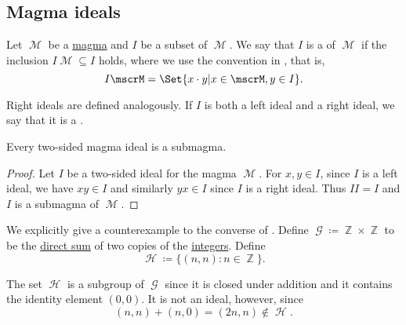 \subsection{Magma ideals}\label{sec:magma_ideals}

\begin{definition}\label{def:magma_ideal}
  Let \( \mscrM \) be a \hyperref[def:magma]{magma} and \( I \) be a subset of \( \mscrM \). We say that \( I \) is a  of \( \mscrM \) if the inclusion \( I\mscrM \subseteq I \) holds, where we use the convention in , that is,
  \begin{equation*}
    I \mscrM = \Set{ x \cdot y | x \in \mscrM, y \in I }.
  \end{equation*}

  Right ideals are defined analogously. If \( I \) is both a left ideal and a right ideal, we say that it is a .
\end{definition}

\begin{proposition}\label{thm:magma_ideal_is_submagma}
  Every two-sided magma ideal is a submagma.
\end{proposition}
\begin{proof}
  Let \( I \) be a two-sided ideal for the magma \( \mscrM \). For \( x, y \in I \), since \( I \) is a left ideal, we have \( xy \in I \) and similarly \( yx \in I \) since \( I \) is a right ideal. Thus \( II = I \) and \( I \) is a submagma of \( \mscrM \).
\end{proof}

\begin{example}\label{ex:subgroup_is_not_ideal}
  We explicitly give a counterexample to the converse of . Define \( \mscrG \coloneqq \BbbZ \times \BbbZ \) to be the \hyperref[def:group_direct_sum]{direct sum} of two copies of the \hyperref[def:integers]{integers}. Define
  \begin{equation*}
    \mscrH \coloneqq \{ (n, n) \colon n \in \BbbZ \}.
  \end{equation*}

  The set \( \mscrH \) is a subgroup of \( \mscrG \) since it is closed under addition and it contains the identity element \( (0, 0) \). It is not an ideal, however, since
  \begin{equation*}
    (n, n) + (n, 0) = (2n, n) \not\in \mscrH.
  \end{equation*}
\end{example}

